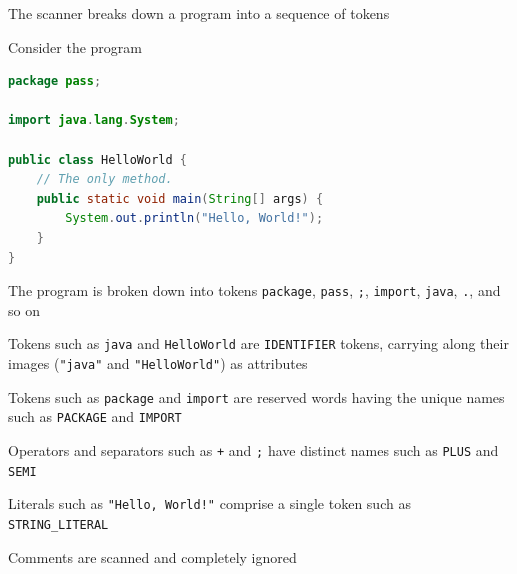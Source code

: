 \documentclass[8pt,a4paper,compress]{beamer}
\begin{document}
\begin{frame}[fragile]
\pause

The scanner breaks down a \jmm program into a sequence of tokens

\pause\bigskip

Consider the program

\pause\smallskip

\begin{tcolorbox}[enhanced,drop shadow southwest,sharp corners,size=fbox,colback=white,fontlower=\small\ttfamily,collower=silver100]

\begin{lstlisting}[language=Java,style=focusin]
package pass;

import java.lang.System;

public class HelloWorld {
    // The only method.
    public static void main(String[] args) {
        System.out.println("Hello, World!");
    }
}
\end{lstlisting}
\end{tcolorbox}

\pause\smallskip

The program is broken down into tokens \lstinline{package}, \lstinline{pass}, \lstinline{;}, \lstinline{import}, \lstinline{java}, \lstinline{.}, and so on

\pause\bigskip

Tokens such as \lstinline{java} and \lstinline{HelloWorld} are \lstinline{IDENTIFIER} tokens, carrying along their images (\lstinline{"java"} and \lstinline{"HelloWorld"}) as attributes

\pause\bigskip

Tokens such as \lstinline{package} and \lstinline{import} are reserved words having the unique names such as \lstinline{PACKAGE} and \lstinline{IMPORT}

\pause\bigskip

Operators and separators such as \lstinline{+} and \lstinline{;} have distinct names such as \lstinline{PLUS} and \lstinline{SEMI}

\pause\bigskip

Literals such as \lstinline{"Hello, World!"} comprise a single token such as \lstinline{STRING_LITERAL}

\pause\bigskip

Comments are scanned and completely ignored
\end{frame}
\end{document}
